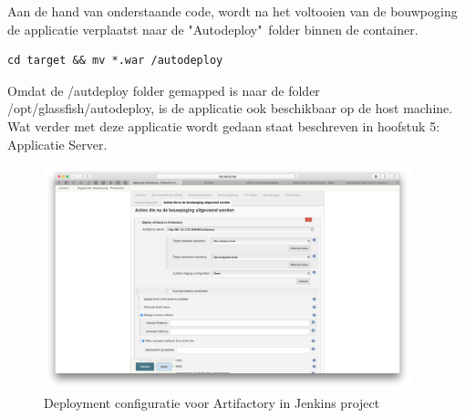 Aan de hand van onderstaande code, wordt na het voltooien van de bouwpoging de applicatie verplaatst naar de "Autodeploy"\ folder binnen de container.
\begin{lstlisting}
cd target && mv *.war /autodeploy
\end{lstlisting}
Omdat de /autdeploy folder gemapped is naar de folder /opt/glassfish/autodeploy, is de applicatie ook beschikbaar op de host machine. Wat verder met deze applicatie wordt gedaan staat beschreven in hoofstuk 5: Applicatie Server.



\begin{figure}[H]
	\centering
	\includegraphics[width=0.95\textwidth]{img/ArtifactoryDeploy.png}
	\caption{Deployment configuratie voor Artifactory in Jenkins project}
	\label{fig:ArtifactoryDeploy}
\end{figure}